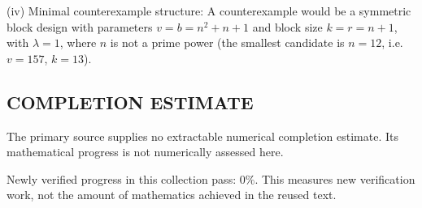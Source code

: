 (iv) Minimal counterexample structure: A counterexample would be a symmetric block design with parameters $v=b=n^2+n+1$ and block size $k=r=n+1$, with $\lambda=1$, where $n$ is not a prime power (the smallest candidate is $n=12$, i.e. $v=157$, $k=13$).




\subsection*{COMPLETION ESTIMATE}
The primary source supplies no extractable numerical completion estimate. Its mathematical progress is not numerically assessed here.

Newly verified progress in this collection pass: $0\%$. This measures new verification work, not the amount of mathematics achieved in the reused text.
